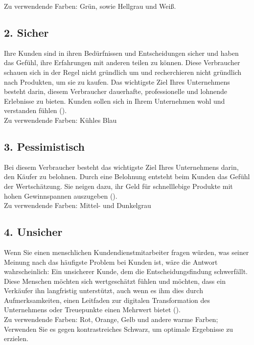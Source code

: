 \documentclass[./dokumentation.tex]{subfiles}
\begin{document}
Zu verwendende Farben: Grün, sowie Hellgrau und Weiß.

\subsection{2. Sicher}
Ihre Kunden sind in ihren Bedürfnissen und Entscheidungen sicher und haben das Gefühl, ihre Erfahrungen mit anderen teilen zu können. Diese Verbraucher schauen sich in der Regel nicht gründlich um und recherchieren nicht gründlich nach Produkten, um sie zu kaufen. Das wichtigste Ziel Ihres Unternehmens besteht darin, diesem Verbraucher dauerhafte, professionelle und lohnende Erlebnisse zu bieten. Kunden sollen sich in Ihrem Unternehmen wohl und verstanden fühlen (\cite{designbro}). \\

Zu verwendende Farben: Kühles Blau\\

\subsection{3. Pessimistisch}
Bei diesem Verbraucher besteht das wichtigste Ziel Ihres Unternehmens darin, den Käufer zu belohnen. Durch eine Belohnung entsteht beim Kunden das Gefühl der Wertschätzung. Sie neigen dazu, ihr Geld für schnelllebige Produkte mit hohen Gewinnspannen auszugeben (\cite{designbro}). \\

Zu verwendende Farben: Mittel- und Dunkelgrau\\
\subsection{4. Unsicher}
Wenn Sie einen menschlichen Kundendienstmitarbeiter fragen würden, was seiner Meinung nach das häufigste Problem bei Kunden ist, wäre die Antwort wahrscheinlich: Ein unsicherer Kunde, dem die Entscheidungsfindung schwerfällt.\\

Diese Menschen möchten sich wertgeschätzt fühlen und möchten, dass ein Verkäufer ihn langfristig unterstützt, auch wenn es ihm dies durch Aufmerksamkeiten, einen Leitfaden zur digitalen Transformation des Unternehmens oder Treuepunkte einen Mehrwert bietet (\cite{designbro}). \\

Zu verwendende Farben: Rot, Orange, Gelb und andere warme Farben; Verwenden Sie es gegen kontrastreiches Schwarz, um optimale Ergebnisse zu erzielen.\\
\end{document}
